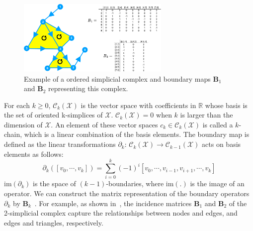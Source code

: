 \begin{figure}[!h]
    \centering
    \includegraphics[width=0.65\textwidth]{Simplicial_Complex/fig}
    \vspace{0.1cm}
    \caption[A simplicial complex example.]{Example of a ordered simplicial complex and boundary maps $\mathbf{B}_1$ and $\mathbf{B}_2$ representing this
complex.}
    \label{fig:sc}
\end{figure}


For each $k \geq 0$, $\mathcal{C}_k(\mathcal{X})$ is the vector space with coefficients in $\mathbb{R}$ whose basis is the set of oriented k-simplices of $\mathcal{X}$. $\mathcal{C}_k(\mathcal{X}) = 0$ when $k$ is larger than the dimension of $\mathcal{X}$. An element of these vector spaces $c_k \in \mathcal{C}_k(\mathcal{X})$ is called a $k$-chain, which is a linear combination of the basis elements. The boundary map is defined as the linear transformations $\partial_{k}$: $\mathcal{C}_k(\mathcal{X}) \rightarrow \mathcal{C}_{k-1}(\mathcal{X})$ acts on basis elements as follows:
\begin{equation}
\partial_k ([v_0,\cdots, v_k]) = \sum_{i=0}^{k} (-1)^i [v_0, \cdots, v_{i-1}, v_{i+1}, \cdots, v_k]
\end{equation}
$\mathrm{im}(\partial_k)$ is the space of $(k-1)$-boundaries, where $\mathrm{im}(.)$ is the image of an operator. We can construct the matrix representation of the boundary operators $\partial_k$ by $\mathbf{B}_k$~\citep{lim2020hodge,muhammad2006control}. For example, as shown in~, the incidence matrices $\mathbf{B}_1$ and $\mathbf{B}_2$ of the 2-simplicial complex capture the relationships between nodes and edges, and edges and triangles, respectively.

